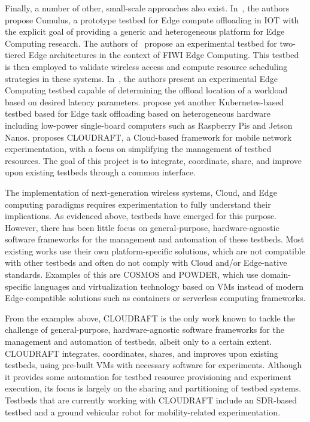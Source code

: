 Finally, a number of other, small-scale approaches also exist.
In~\cite{gedawy2016cumulus}, the authors propose Cumulus, a prototype testbed for Edge compute offloading in \gls{IOT} with the explicit goal of providing a generic and heterogeneous platform for Edge Computing research.
The authors of~\cite{rimal2018experimental} propose an experimental testbed for two-tiered Edge architectures in the context of \gls{FIWI} Edge Computing.
This testbed is then employed to validate wireless access and compute resource scheduling strategies in these systems.
In~\cite{yamanaka2021design}, the authors present an experimental Edge Computing testbed capable of determining the offload location of a workload based on desired latency parameters.
\cite{diao2019scalable} propose yet another Kubernetes-based testbed based for Edge task offloading based on heterogeneous hardware including low-power single-board computers such as Raspberry Pis and Jetson Nanos.\@
\cite{moorthy2022cloudraft} proposes \gls{CLOUDRAFT}, a Cloud-based framework for mobile network experimentation, with a focus on simplifying the management of testbed resources.
The goal of this project is to integrate, coordinate, share, and improve upon existing testbeds through a common interface.

\medskip

The implementation of next-generation wireless systems, Cloud, and Edge computing paradigms requires experimentation to fully understand their implications.
As evidenced above, testbeds have emerged for this purpose.
However, there has been little focus on general-purpose, hardware-agnostic software frameworks for the management and automation of these testbeds.
Most existing works use their own platform-specific solutions, which are not compatible with other testbeds and often do not comply with Cloud and/or Edge-native standards.
Examples of this are \gls{COSMOS} and \gls{POWDER}, which use domain-specific languages and virtualization technology based on \glspl{VM} instead of modern Edge-compatible solutions such as containers or serverless computing frameworks.

From the examples above, \gls{CLOUDRAFT} is the only work known to tackle the challenge of general-purpose, hardware-agnostic software frameworks for the management and automation of testbeds, albeit only to a certain extent.
\gls{CLOUDRAFT} integrates, coordinates, shares, and improves upon existing testbeds, using pre-built VMs with necessary software for experiments.
Although it provides some automation for testbed resource provisioning and experiment execution, its focus is largely on the sharing and partitioning of testbed systems.
Testbeds that are currently working with \gls{CLOUDRAFT} include an \gls{SDR}-based testbed and a ground vehicular robot for mobility-related experimentation.


